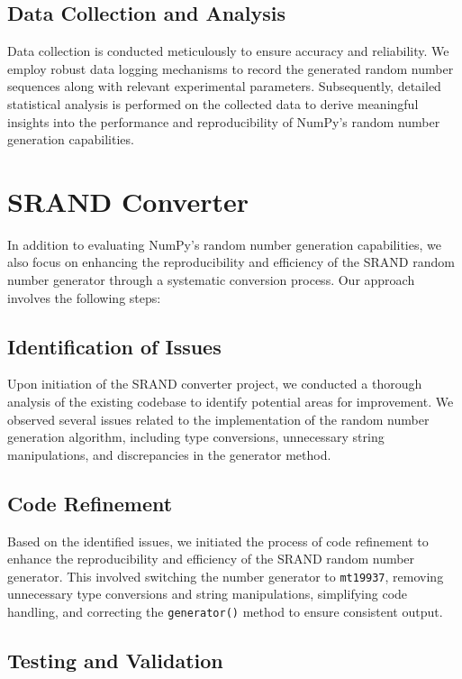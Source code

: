 \documentclass{article}
\begin{document}
\subsection*{Data Collection and Analysis}

Data collection is conducted meticulously to ensure accuracy and reliability. We employ robust data logging mechanisms to record the generated random number sequences along with relevant experimental parameters. Subsequently, detailed statistical analysis is performed on the collected data to derive meaningful insights into the performance and reproducibility of NumPy's random number generation capabilities.

\section*{SRAND Converter}

In addition to evaluating NumPy's random number generation capabilities, we also focus on enhancing the reproducibility and efficiency of the SRAND random number generator through a systematic conversion process. Our approach involves the following steps:

\subsection*{Identification of Issues}

Upon initiation of the SRAND converter project, we conducted a thorough analysis of the existing codebase to identify potential areas for improvement. We observed several issues related to the implementation of the random number generation algorithm, including type conversions, unnecessary string manipulations, and discrepancies in the generator method.

\subsection*{Code Refinement}

Based on the identified issues, we initiated the process of code refinement to enhance the reproducibility and efficiency of the SRAND random number generator. This involved switching the number generator to \texttt{mt19937}, removing unnecessary type conversions and string manipulations, simplifying code handling, and correcting the \texttt{generator()} method to ensure consistent output.
\vspace{2cm}

\subsection*{Testing and Validation}
\end{document}
